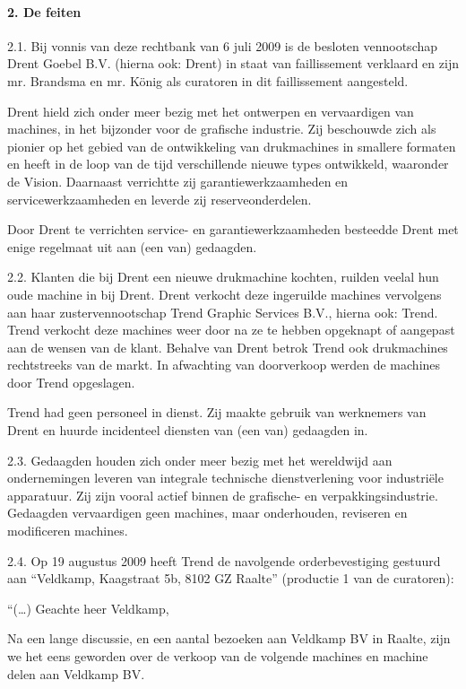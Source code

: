\documentclass[
  dutch,
  a4paper,
]{article}
\begin{document}
\paragraph{2. De feiten}\label{de-feiten-2}

2.1. Bij vonnis van deze rechtbank van 6 juli 2009 is de besloten vennootschap Drent Goebel B.V. (hierna ook: Drent) in staat van faillissement verklaard en zijn mr. Brandsma en mr. König als curatoren in dit faillissement aangesteld.

Drent hield zich onder meer bezig met het ontwerpen en vervaardigen van machines, in het bijzonder voor de grafische industrie. Zij beschouwde zich als pionier op het gebied van de ontwikkeling van drukmachines in smallere formaten en heeft in de loop van de tijd verschillende nieuwe types ontwikkeld, waaronder de Vision. Daarnaast verrichtte zij garantiewerkzaamheden en servicewerkzaamheden en leverde zij reserveonderdelen.

Door Drent te verrichten service- en garantiewerkzaamheden besteedde Drent met enige regelmaat uit aan (een van) gedaagden.

2.2. Klanten die bij Drent een nieuwe drukmachine kochten, ruilden veelal hun oude machine in bij Drent. Drent verkocht deze ingeruilde machines vervolgens aan haar zustervennootschap Trend Graphic Services B.V., hierna ook: Trend. Trend verkocht deze machines weer door na ze te hebben opgeknapt of aangepast aan de wensen van de klant. Behalve van Drent betrok Trend ook drukmachines rechtstreeks van de markt. In afwachting van doorverkoop werden de machines door Trend opgeslagen.

Trend had geen personeel in dienst. Zij maakte gebruik van werknemers van Drent en huurde incidenteel diensten van (een van) gedaagden in.

2.3. Gedaagden houden zich onder meer bezig met het wereldwijd aan ondernemingen leveren van integrale technische dienstverlening voor industriële apparatuur. Zij zijn vooral actief binnen de grafische- en verpakkingsindustrie. Gedaagden vervaardigen geen machines, maar onderhouden, reviseren en modificeren machines.

2.4. Op 19 augustus 2009 heeft Trend de navolgende orderbevestiging gestuurd aan ``Veldkamp, Kaagstraat 5b, 8102 GZ Raalte'' (productie 1 van de curatoren):

``(\ldots) Geachte heer Veldkamp,

Na een lange discussie, en een aantal bezoeken aan Veldkamp BV in Raalte, zijn we het eens geworden over de verkoop van de volgende machines en machine delen aan Veldkamp BV.
\end{document}
